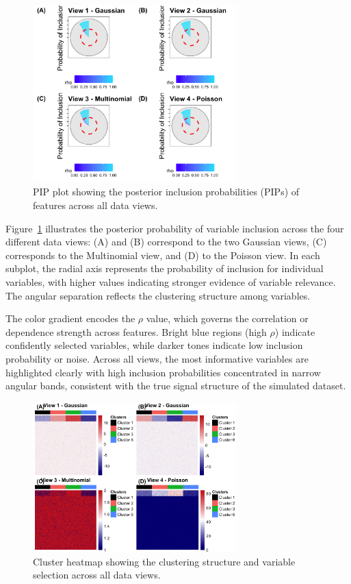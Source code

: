 \begin{figure}[!h]
  \centering
  \includegraphics[width=0.7\textwidth]{../results/piplot_sim_data.png}
  \caption{PIP plot showing the posterior inclusion probabilities (PIPs) of features across all data views.}
  \label{fig:piplot}
\end{figure}

Figure~\ref{fig:piplot} illustrates the posterior probability of variable inclusion across
 the four different data views: (A) and (B) correspond to the two Gaussian views, 
 (C) corresponds to the Multinomial view, and (D) to the Poisson view.
  In each subplot, the radial axis represents the probability of inclusion for individual variables,
   with higher values indicating stronger evidence of variable relevance.
    The angular separation reflects the clustering structure among variables.

The color gradient encodes the \(\rho\) value, which governs the correlation or dependence strength across features. Bright blue regions (high \(\rho\)) indicate confidently selected variables, while darker tones indicate low inclusion probability or noise. Across all views, the most informative variables are highlighted clearly with high inclusion probabilities concentrated in narrow angular bands, consistent with the true signal structure of the simulated dataset.


\begin{figure}[!h]
  \centering
  \includegraphics[width=0.7\textwidth]{../results/hamp_sim_data.png}
  \caption{Cluster heatmap showing the clustering structure and variable selection across all data views.}
  \label{fig:chmap_sim_data}
\end{figure}

